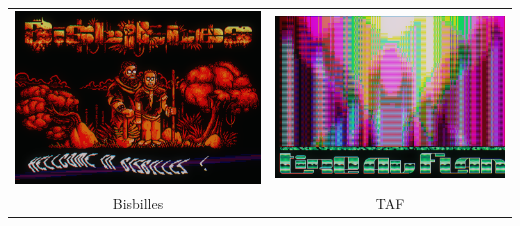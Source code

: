\documentclass{beamer}
\begin{document}
\begin{frame}
\begin{columns}
\begin{column}{.62\linewidth}
{\begin{tabular}{@{}cc@{}}
	  \includegraphics[width=0.45\linewidth]{imgs/demo_bisbilles} &
	  \includegraphics[width=0.45\linewidth]{imgs/demo_taf}
	  \\

	  Bisbilles & TAF \\

	\end{tabular}
	}
\end{column}
\end{columns}
\end{frame}
\end{document}
